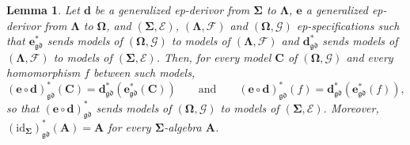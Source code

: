 \documentclass{amsart}
\theoremstyle{plain}
\newtheorem{lemma}[theorem]{Lemma}
\theoremstyle{definition}
\begin{document}
\begin{lemma}\label{LGenEpComp}
Let $\mathbf{d}$ be a generalized ep-derivor from $\mathbf{\Sigma}$ to $\mathbf{\Lambda}$, $\mathbf{e}$ a generalized ep-derivor from $\mathbf{\Lambda}$ to $\mathbf{\Omega}$, and $(\mathbf{\Sigma},\mathcal{E})$, $(\mathbf{\Lambda},\mathcal{F})$ and $(\mathbf{\Omega},\mathcal{G})$ ep-specifications such that $\mathbf{e}^{\ast}_{\mathfrak{gd}}$ sends models of $(\mathbf{\Omega},\mathcal{G})$ to models of $(\mathbf{\Lambda},\mathcal{F})$ and $\mathbf{d}^{\ast}_{\mathfrak{gd}}$ sends models of $(\mathbf{\Lambda},\mathcal{F})$ to models of $(\mathbf{\Sigma},\mathcal{E})$. Then, for every model $\mathbf{C}$ of $(\mathbf{\Omega},\mathcal{G})$ and every homomorphism $f$ between such models,
$$
(\mathbf{e}\circ\mathbf{d})^{\ast}_{\mathfrak{gd}}(\mathbf{C})=\mathbf{d}^{\ast}_{\mathfrak{gd}}(\mathbf{e}^{\ast}_{\mathfrak{gd}}(\mathbf{C}))
\qquad\text{and}\qquad
(\mathbf{e}\circ\mathbf{d})^{\ast}_{\mathfrak{gd}}(f)=\mathbf{d}^{\ast}_{\mathfrak{gd}}(\mathbf{e}^{\ast}_{\mathfrak{gd}}(f)),
$$
so that $(\mathbf{e}\circ\mathbf{d})^{\ast}_{\mathfrak{gd}}$ sends models of $(\mathbf{\Omega},\mathcal{G})$ to models of $(\mathbf{\Sigma},\mathcal{E})$. Moreover, $(\mathrm{id}_{\mathbf{\Sigma}})^{\ast}_{\mathfrak{gd}}(\mathbf{A})=\mathbf{A}$ for every $\mathbf{\Sigma}$-algebra $\mathbf{A}$.
\end{lemma}
\end{document}
